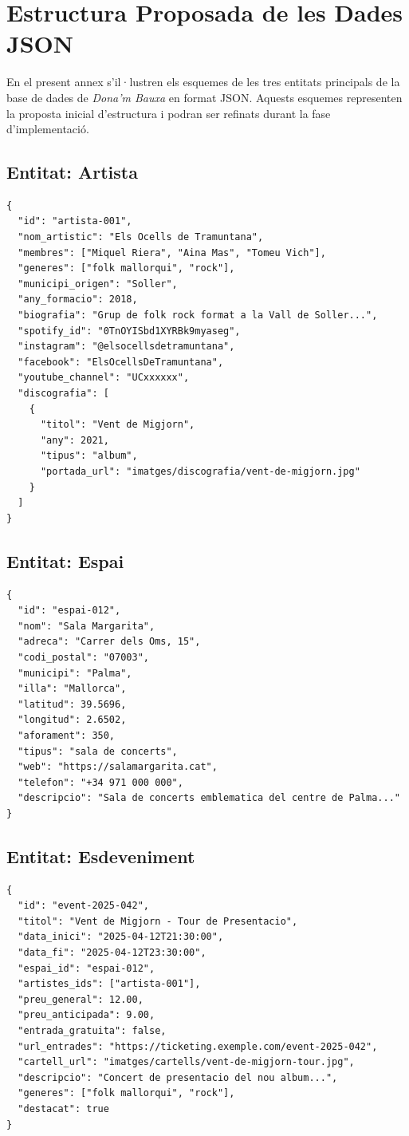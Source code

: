 \chapter{Estructura Proposada de les Dades JSON}
\label{appendix:json}

En el present annex s'il·lustren els esquemes de les tres entitats principals de la base de dades de \textit{Dona'm Bauxa} en format JSON. Aquests esquemes representen la proposta inicial d'estructura i podran ser refinats durant la fase d'implementació.

\section*{Entitat: Artista}

\begin{lstlisting}[language={}]
{
  "id": "artista-001",
  "nom_artistic": "Els Ocells de Tramuntana",
  "membres": ["Miquel Riera", "Aina Mas", "Tomeu Vich"],
  "generes": ["folk mallorqui", "rock"],
  "municipi_origen": "Soller",
  "any_formacio": 2018,
  "biografia": "Grup de folk rock format a la Vall de Soller...",
  "spotify_id": "0TnOYISbd1XYRBk9myaseg",
  "instagram": "@elsocellsdetramuntana",
  "facebook": "ElsOcellsDeTramuntana",
  "youtube_channel": "UCxxxxxx",
  "discografia": [
    {
      "titol": "Vent de Migjorn",
      "any": 2021,
      "tipus": "album",
      "portada_url": "imatges/discografia/vent-de-migjorn.jpg"
    }
  ]
}
\end{lstlisting}

\section*{Entitat: Espai}

\begin{lstlisting}[language={}]
{
  "id": "espai-012",
  "nom": "Sala Margarita",
  "adreca": "Carrer dels Oms, 15",
  "codi_postal": "07003",
  "municipi": "Palma",
  "illa": "Mallorca",
  "latitud": 39.5696,
  "longitud": 2.6502,
  "aforament": 350,
  "tipus": "sala de concerts",
  "web": "https://salamargarita.cat",
  "telefon": "+34 971 000 000",
  "descripcio": "Sala de concerts emblematica del centre de Palma..."
}
\end{lstlisting}

\section*{Entitat: Esdeveniment}

\begin{lstlisting}[language={}]
{
  "id": "event-2025-042",
  "titol": "Vent de Migjorn - Tour de Presentacio",
  "data_inici": "2025-04-12T21:30:00",
  "data_fi": "2025-04-12T23:30:00",
  "espai_id": "espai-012",
  "artistes_ids": ["artista-001"],
  "preu_general": 12.00,
  "preu_anticipada": 9.00,
  "entrada_gratuita": false,
  "url_entrades": "https://ticketing.exemple.com/event-2025-042",
  "cartell_url": "imatges/cartells/vent-de-migjorn-tour.jpg",
  "descripcio": "Concert de presentacio del nou album...",
  "generes": ["folk mallorqui", "rock"],
  "destacat": true
}
\end{lstlisting}
